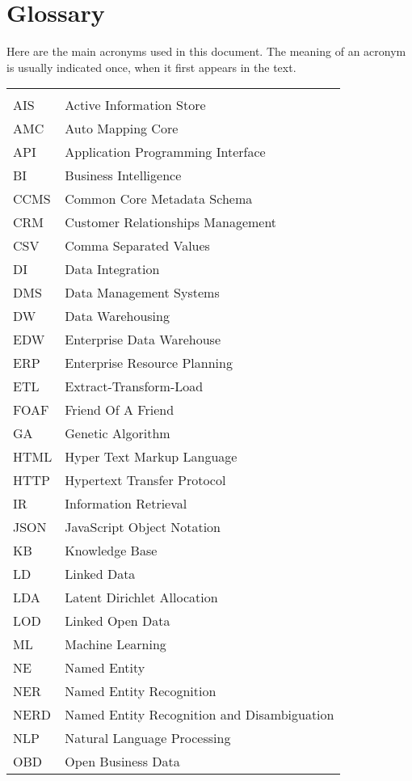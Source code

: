 \chapter*{Glossary}

Here are the main acronyms used in this document. The meaning of an acronym is usually indicated once, when it first appears in the text.

\begin{longtable}{lp{9cm}}
 &\\
 AIS & Active Information Store \\
 AMC & Auto Mapping Core \\
 API  & Application Programming Interface \\
 BI & Business Intelligence\\
 CCMS & Common Core Metadata Schema \\
 CRM & Customer Relationships Management\\
 CSV & Comma Separated Values\\
 DI & Data Integration \\
 DMS & Data Management Systems\\
 DW & Data Warehousing \\
 EDW & Enterprise Data Warehouse\\
 ERP &  Enterprise Resource Planning\\
 ETL & Extract-Transform-Load \\
 FOAF & Friend Of A Friend \\
 GA & Genetic Algorithm \\
 HTML &   Hyper Text Markup Language\\
 HTTP & Hypertext Transfer Protocol \\
 IR & Information Retrieval \\
 JSON & JavaScript Object Notation \\
 KB & Knowledge Base \\
 LD & Linked Data\\
 LDA & Latent Dirichlet Allocation \\
 LOD & Linked Open Data \\
 ML & Machine Learning \\
 NE & Named Entity \\
 NER & Named Entity Recognition\\
 NERD & Named Entity Recognition and Disambiguation \\
 NLP & Natural Language Processing \\
 OBD & Open Business Data\\

\end{longtable}
